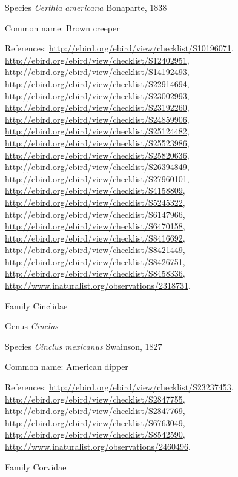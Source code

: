 \documentclass[9pt, article]{memoir}
\begin{document}
\begin{multicols}{2}
\vspace{6pt}\noindent\hspace{36pt}Species \textit{Certhia americana} Bonaparte, 1838


Common name: Brown creeper

References: 
\url{http://ebird.org/ebird/view/checklist/S10196071}, 
\url{http://ebird.org/ebird/view/checklist/S12402951}, 
\url{http://ebird.org/ebird/view/checklist/S14192493}, 
\url{http://ebird.org/ebird/view/checklist/S22914694}, 
\url{http://ebird.org/ebird/view/checklist/S23002993}, 
\url{http://ebird.org/ebird/view/checklist/S23192260}, 
\url{http://ebird.org/ebird/view/checklist/S24859906}, 
\url{http://ebird.org/ebird/view/checklist/S25124482}, 
\url{http://ebird.org/ebird/view/checklist/S25523986}, 
\url{http://ebird.org/ebird/view/checklist/S25820636}, 
\url{http://ebird.org/ebird/view/checklist/S26394849}, 
\url{http://ebird.org/ebird/view/checklist/S27960101}, 
\url{http://ebird.org/ebird/view/checklist/S4158809}, 
\url{http://ebird.org/ebird/view/checklist/S5245322}, 
\url{http://ebird.org/ebird/view/checklist/S6147966}, 
\url{http://ebird.org/ebird/view/checklist/S6470158}, 
\url{http://ebird.org/ebird/view/checklist/S8416692}, 
\url{http://ebird.org/ebird/view/checklist/S8421449}, 
\url{http://ebird.org/ebird/view/checklist/S8426751}, 
\url{http://ebird.org/ebird/view/checklist/S8458336}, 
\url{http://www.inaturalist.org/observations/2318731}.

\vspace{6pt}\noindent\hspace{24pt}Family Cinclidae


\vspace{6pt}\noindent\hspace{30pt}Genus \textit{Cinclus}


\vspace{6pt}\noindent\hspace{36pt}Species \textit{Cinclus mexicanus} Swainson, 1827


Common name: American dipper

References: 
\url{http://ebird.org/ebird/view/checklist/S23237453}, 
\url{http://ebird.org/ebird/view/checklist/S2847755}, 
\url{http://ebird.org/ebird/view/checklist/S2847769}, 
\url{http://ebird.org/ebird/view/checklist/S6763049}, 
\url{http://ebird.org/ebird/view/checklist/S8542590}, 
\url{http://www.inaturalist.org/observations/2460496}.

\vspace{6pt}\noindent\hspace{24pt}Family Corvidae



\end{multicols}
\end{document}
